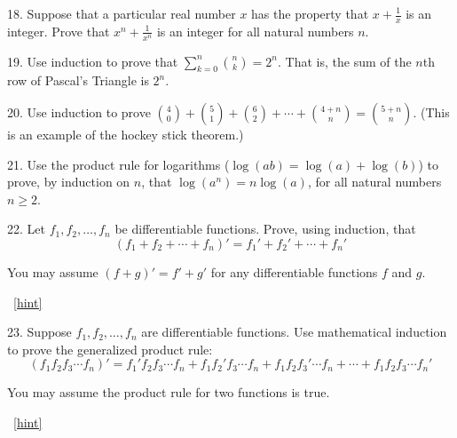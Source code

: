 \documentclass[10pt,]{book}
\theoremstyle{plain}
\theoremstyle{definition}
\theoremstyle{definition}
\theoremstyle{definition}
\numberwithin{equation}{chapter}
\def\d{\displaystyle}
\begin{document}
\begin{exerciselist}
\par\smallskip
\item[18.]\hypertarget{exercise-152}{}\hypertarget{p-2819}{}%
Suppose that a particular real number \(x\) has the property that \(x + \frac{1}{x}\) is an integer. Prove that \(x^n + \frac{1}{x^n}\) is an integer for all natural numbers \(n\).%
\par\smallskip
\item[19.]\hypertarget{exercise-153}{}\hypertarget{p-2822}{}%
Use induction to prove that \(\d\sum_{k=0}^n {n \choose k} = 2^n\). That is, the sum of the \(n\)th row of Pascal's Triangle is \(2^n\).%
\par\smallskip
\item[20.]\hypertarget{exercise-154}{}\hypertarget{p-2823}{}%
Use induction to prove \({4 \choose 0} + {5 \choose 1} + {6 \choose 2} + \cdots + {4+n \choose n} = {5+n \choose n}\). (This is an example of the hockey stick theorem.)%
\par\smallskip
\item[21.]\hypertarget{exercise-155}{}\hypertarget{p-2824}{}%
Use the product rule for logarithms (\(\log(ab) = \log(a) + \log(b)\)) to prove, by induction on \(n\), that \(\log(a^n) = n \log(a)\), for all natural numbers \(n \ge 2\).%
\par\smallskip
\item[22.]\hypertarget{exercise-156}{}\hypertarget{p-2827}{}%
Let \(f_1, f_2,\ldots, f_n\) be differentiable functions. Prove, using induction, that%
\begin{equation*}
(f_1 + f_2 + \cdots + f_n)' = f_1' + f_2' + \cdots + f_n'
\end{equation*}
%
\par
\hypertarget{p-2828}{}%
You may assume \((f+g)' = f' + g'\) for any differentiable functions \(f\) and \(g\).%
\par\smallskip
~\hfill{\tiny\hyperlink{a-B.6.22}{[hint]}\hypertarget{q-B.6.22}{}}\item[23.]\hypertarget{exercise-157}{}\hypertarget{p-2830}{}%
Suppose \(f_1, f_2, \ldots, f_n\) are differentiable functions. Use mathematical induction to prove the generalized product rule:%
\begin{equation*}
(f_1 f_2 f_3 \cdots f_n)' = f_1' f_2 f_3 \cdots f_n + f_1 f_2' f_3 \cdots f_n + f_1 f_2 f_3' \cdots f_n + \cdots + f_1 f_2 f_3 \cdots f_n'
\end{equation*}
%
\par
\hypertarget{p-2831}{}%
You may assume the product rule for two functions is true.%
\par\smallskip
~\hfill{\tiny\hyperlink{a-B.6.23}{[hint]}\hypertarget{q-B.6.23}{}}\end{exerciselist}
\typeout{************************************************}
\typeout{************************************************}
\end{document}
